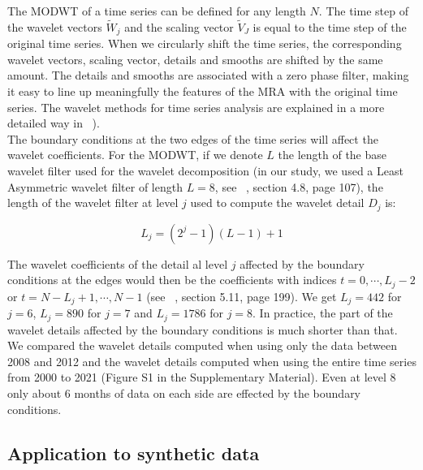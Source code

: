 \documentclass{article}
\begin{document}
The MODWT of a time series can be defined for any length $N$. The time step of the wavelet vectors $\widetilde{W}_j$ and the scaling vector $\widetilde{V}_J$ is equal to the time step of the original time series. When we circularly shift the time series, the corresponding wavelet vectors, scaling vector, details and smooths are shifted by the same amount. The details and smooths are associated with a zero phase filter, making it easy to line up meaningfully the features of the MRA with the original time series. The wavelet methods for time series analysis are explained in a more detailed way in ~\citep{PER_2000}). \\

The boundary conditions at the two edges of the time series will affect the wavelet coefficients. For the MODWT, if we denote $L$ the length of the base wavelet filter used for the wavelet decomposition (in our study, we used a Least Asymmetric wavelet filter of length $L = 8$, see ~\citep{PER_2000}, section 4.8, page 107), the length of the wavelet filter at level $j$ used to compute the wavelet detail $D_j$ is:

\begin{equation*}
L_j = \left( 2^j - 1 \right) \left( L - 1 \right) + 1
\end{equation*}

The wavelet coefficients of the detail al level $j$ affected by the boundary conditions at the edges would then be the coefficients with indices $t = 0 , \cdots , L_j - 2$ or $t = N - L_j + 1 , \cdots, N - 1$ (see ~\citep{PER_2000}, section 5.11, page 199). We get $L_j = 442$ for $j = 6$, $L_j = 890$ for $j = 7$ and $L_j = 1786$ for $j = 8$. In practice, the part of the wavelet details affected by the boundary conditions is much shorter than that. We compared the wavelet details computed when using only the data between 2008 and 2012 and the wavelet details computed when using the entire time series from 2000 to 2021 (Figure S1 in the Supplementary Material). Even at level 8 only about 6 months of data on each side are effected by the boundary conditions.

\subsection{Application to synthetic data}
\end{document}
